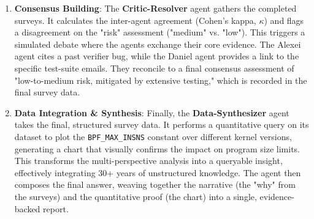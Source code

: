 \begin{enumerate}
\item \textbf{Consensus Building}: The \textbf{Critic-Resolver} agent gathers the completed surveys. It calculates the inter-agent agreement (Cohen's kappa, $\kappa$) and flags a disagreement on the "risk" assessment ("medium" vs. "low"). This triggers a simulated debate where the agents exchange their core evidence. The Alexei agent cites a past verifier bug, while the Daniel agent provides a link to the specific test-suite emails. They reconcile to a final consensus assessment of "low-to-medium risk, mitigated by extensive testing," which is recorded in the final survey data.

\item \textbf{Data Integration \& Synthesis}: Finally, the \textbf{Data-Synthesizer} agent takes the final, structured survey data. It performs a quantitative query on its dataset to plot the \texttt{BPF\_MAX\_INSNS} constant over different kernel versions, generating a chart that visually confirms the impact on program size limits. This transforms the multi-perspective analysis into a queryable insight, effectively integrating 30+ years of unstructured knowledge. The agent then composes the final answer, weaving together the narrative (the "why" from the surveys) and the quantitative proof (the chart) into a single, evidence-backed report.
\end{enumerate}

